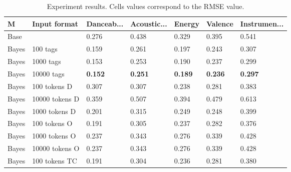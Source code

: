 \documentclass[sn-mathphys]{sn-jnl}%
\theoremstyle{thmstyleone}%
\theoremstyle{thmstyletwo}%
\theoremstyle{thmstylethree}%
\begin{document}
\begin{table}[h!]
      \begin{center}
      \begin{minipage}{\textwidth}
      \caption{Experiment results. Cells values correspond to the RMSE value.}\label{table:experiment_results}%
      \begin{tabular}{@{}lllllll@{}}
      \toprule
      M         & Input format                        & Danceab...       & Acoustic...    & Energy          & Valence         & Instrumen... \\
      \midrule
      Base      &                                     & 0.276            & 0.438           & 0.329          & 0.395           & 0.541          \\
      \midrule
      Bayes     & 100 tags\footnotemark[1]            & 0.159            & 0.261           & 0.197          & 0.243           & 0.307          \\
      Bayes     & 1000 tags                           & 0.153            & 0.253           & 0.190          & 0.237           & 0.299          \\
      Bayes     & 10000 tags                          &\textbf{0.152}    &\textbf{0.251}   &\textbf{0.189}  &\textbf{0.236}   &\textbf{0.297}  \\
      Bayes     & 100 tokens D\footnotemark[2]        & 0.307            & 0.307           & 0.238          & 0.281           & 0.383          \\
      Bayes     & 10000 tokens D                      & 0.359            & 0.507           & 0.394          & 0.479           & 0.613          \\
      Bayes     & 1000 tokens D                       & 0.201            & 0.315           & 0.249          & 0.248           & 0.399          \\
      Bayes     & 100 tokens O\footnotemark[3]        & 0.191            & 0.305           & 0.237          & 0.282           & 0.376          \\
      Bayes     & 1000 tokens O                       & 0.237            & 0.343           & 0.276          & 0.339           & 0.428          \\
      Bayes     & 10000 tokens O                      & 0.237            & 0.343           & 0.276          & 0.339           & 0.428          \\
      Bayes     & 100 tokens TC\footnotemark[4]       & 0.191            & 0.304           & 0.236          & 0.281           & 0.380          \\

\end{tabular}
\end{minipage}
\end{center}
\end{table}
\end{document}
